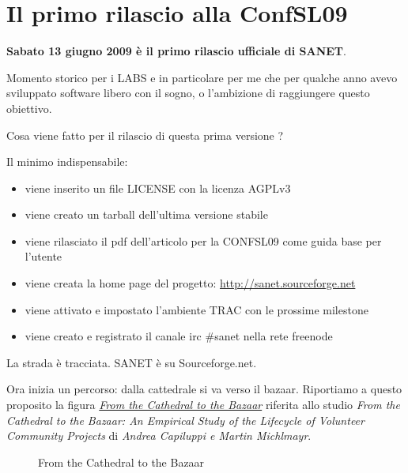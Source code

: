 \documentclass[a4wide,10pt,italian]{manual}
\begin{document}
\section{Il primo rilascio alla ConfSL09}

\textbf{Sabato 13 giugno 2009 è il primo rilascio ufficiale di SANET}.

Momento storico per i LABS e in particolare per me che per qualche anno
avevo sviluppato software libero con il sogno, o l'ambizione di raggiungere questo obiettivo.

Cosa viene fatto per il rilascio di questa prima versione ?

Il minimo indispensabile:
\begin{itemize}
\item {} 
viene inserito un file LICENSE con la licenza AGPLv3

\item {} 
viene creato un tarball dell'ultima versione stabile

\item {} 
viene rilasciato il pdf dell'articolo per la CONFSL09 come guida base per l'utente

\item {} 
viene creata la home page del progetto: \href{http://sanet.sourceforge.net}{http://sanet.sourceforge.net}

\item {} 
viene attivato e impostato l'ambiente TRAC con le prossime milestone

\item {} 
viene creato e registrato il canale irc \#sanet nella rete freenode

\end{itemize}

La strada è tracciata. SANET è su Sourceforge.net.

Ora inizia un percorso: dalla cattedrale si va verso il bazaar.
Riportiamo a questo proposito la figura \hyperlink{from-tc-to-tb}{\emph{From the Cathedral to the Bazaar}} riferita allo studio
\emph{From the Cathedral to the Bazaar: An Empirical Study of the Lifecycle of Volunteer Community Projects}
di \emph{Andrea Capiluppi e Martin Michlmayr}.
\hypertarget{from-tc-to-tb}{}\begin{figure}[htbp]
\centering

\caption{From the Cathedral to the Bazaar}\end{figure}
\end{document}
